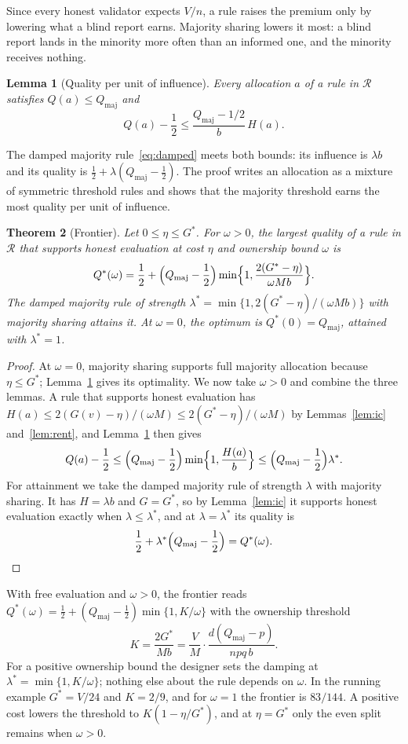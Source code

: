 \documentclass[sigconf,anonymous,review]{acmart}
\numberwithin{equation}{section}
\newtheorem{theorem}{Theorem}[section]
\newtheorem{lemma}[theorem]{Lemma}
\newcommand{\Qmaj}{Q_{\mathrm{maj}}}
\newcommand{\Gs}{G^{*}}
\newcommand{\Rset}{\mathcal{R}}
\begin{document}
Since every honest validator expects $V/n$, a rule raises the premium only by
lowering what a blind report earns. Majority sharing lowers it most: a blind
report lands in the minority more often than an informed one, and the minority
receives nothing.

\begin{lemma}[Quality per unit of influence]\label{lem:influence}
Every allocation $a$ of a rule in $\Rset$ satisfies $Q(a)\le\Qmaj$ and
\[
Q(a)-\frac12\le\frac{\Qmaj-1/2}{b}\,H(a).
\]
\end{lemma}

The damped majority rule~\eqref{eq:damped} meets both bounds: its influence is
$\lambda b$ and its quality is $\frac12+\lambda(\Qmaj-\frac12)$. The proof writes
an allocation as a mixture of symmetric threshold rules and shows that the
majority threshold earns the most quality per unit of influence.

\begin{theorem}[Frontier]\label{thm:frontier}
Let $0\le\eta\le\Gs$. For $\omega>0$, the largest quality of a rule in $\Rset$
that supports honest evaluation at cost $\eta$ and ownership bound $\omega$ is
\[
Q^*(\omega)=\frac12+\Bigl(\Qmaj-\frac12\Bigr)\min\Bigl\{1,\frac{2(\Gs-\eta)}{\omega Mb}\Bigr\}.
\]
The damped majority rule of strength
$\lambda^*=\min\{1,2(\Gs-\eta)/(\omega Mb)\}$ with majority sharing attains it.
At $\omega=0$, the optimum is $Q^*(0)=\Qmaj$, attained with $\lambda^*=1$.
\end{theorem}

\begin{proof}
At $\omega=0$, majority sharing supports full majority allocation because
$\eta\le\Gs$; Lemma~\ref{lem:influence} gives its optimality. We now take
$\omega>0$ and combine the three lemmas. A rule that supports honest evaluation has
$H(a)\le2(G(v)-\eta)/(\omega M)\le2(\Gs-\eta)/(\omega M)$ by
Lemmas~\ref{lem:ic} and~\ref{lem:rent}, and Lemma~\ref{lem:influence} then gives
\[
Q(a)-\frac12\le\Bigl(\Qmaj-\frac12\Bigr)\min\Bigl\{1,\frac{H(a)}b\Bigr\}
\le\Bigl(\Qmaj-\frac12\Bigr)\lambda^*.
\]
For attainment we take the damped majority rule of strength $\lambda$ with
majority sharing. It has $H=\lambda b$ and $G=\Gs$, so by Lemma~\ref{lem:ic} it
supports honest evaluation exactly when $\lambda\le\lambda^*$, and at
$\lambda=\lambda^*$ its quality is
\[
\frac12+\lambda^*\Bigl(\Qmaj-\frac12\Bigr)=Q^*(\omega).\qedhere
\]
\end{proof}

With free evaluation and $\omega>0$, the frontier reads $Q^*(\omega)=\frac12+(\Qmaj-\frac12)\min\{1,K/\omega\}$
with the ownership threshold
\begin{equation}\label{eq:K}
K=\frac{2\Gs}{Mb}=\frac VM\cdot\frac{d(\Qmaj-p)}{npq\,b}.
\end{equation}
For a positive ownership bound the designer sets the damping at
$\lambda^*=\min\{1,K/\omega\}$; nothing else about the rule depends on
$\omega$. In the running example $\Gs=V/24$ and $K=2/9$, and for $\omega=1$ the
frontier is $83/144$. A positive cost lowers the threshold to
$K(1-\eta/\Gs)$, and at $\eta=\Gs$ only the even split remains when $\omega>0$.
\end{document}
